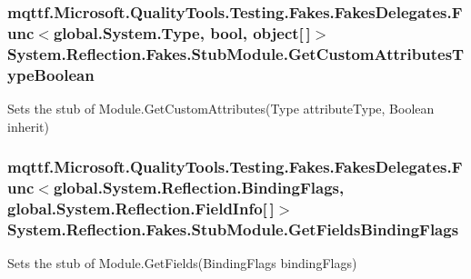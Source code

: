 \hypertarget{class_system_1_1_reflection_1_1_fakes_1_1_stub_module_ac83f634630701562639b5b1ac5869535}{
\subsubsection[{Get\-Custom\-Attributes\-Type\-Boolean}]{\setlength{\rightskip}{0pt plus 5cm}mqttf.\-Microsoft.\-Quality\-Tools.\-Testing.\-Fakes.\-Fakes\-Delegates.\-Func$<$global.\-System.\-Type, bool, object\mbox{[}$\,$\mbox{]}$>$ System.\-Reflection.\-Fakes.\-Stub\-Module.\-Get\-Custom\-Attributes\-Type\-Boolean}}\label{class_system_1_1_reflection_1_1_fakes_1_1_stub_module_ac83f634630701562639b5b1ac5869535}


Sets the stub of Module.\-Get\-Custom\-Attributes(\-Type attribute\-Type, Boolean inherit)

\hypertarget{class_system_1_1_reflection_1_1_fakes_1_1_stub_module_a33330626abe346e8ef46353733cf7f46}{
\subsubsection[{Get\-Fields\-Binding\-Flags}]{\setlength{\rightskip}{0pt plus 5cm}mqttf.\-Microsoft.\-Quality\-Tools.\-Testing.\-Fakes.\-Fakes\-Delegates.\-Func$<$global.\-System.\-Reflection.\-Binding\-Flags, global.\-System.\-Reflection.\-Field\-Info\mbox{[}$\,$\mbox{]}$>$ System.\-Reflection.\-Fakes.\-Stub\-Module.\-Get\-Fields\-Binding\-Flags}}\label{class_system_1_1_reflection_1_1_fakes_1_1_stub_module_a33330626abe346e8ef46353733cf7f46}


Sets the stub of Module.\-Get\-Fields(\-Binding\-Flags binding\-Flags)


